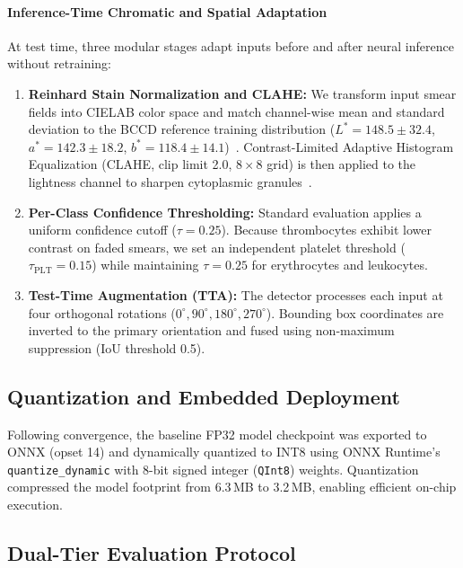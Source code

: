 \documentclass[10pt,conference]{IEEEtran}
\begin{document}
\paragraph{Inference-Time Chromatic and Spatial Adaptation}
At test time, three modular stages adapt inputs before and after neural inference without retraining:
\begin{enumerate}
  \item \textbf{Reinhard Stain Normalization and CLAHE:} We transform input smear fields into CIELAB color space and match channel-wise mean and standard deviation to the BCCD reference training distribution ($L^* = 148.5 \pm 32.4$, $a^* = 142.3 \pm 18.2$, $b^* = 118.4 \pm 14.1$)~\cite{reinhard2001}. Contrast-Limited Adaptive Histogram Equalization (CLAHE, clip limit 2.0, $8 \times 8$ grid) is then applied to the lightness channel to sharpen cytoplasmic granules~\cite{zuiderveld1994}.
  \item \textbf{Per-Class Confidence Thresholding:} Standard evaluation applies a uniform confidence cutoff ($\tau = 0.25$). Because thrombocytes exhibit lower contrast on faded smears, we set an independent platelet threshold ($\tau_{\text{PLT}} = 0.15$) while maintaining $\tau = 0.25$ for erythrocytes and leukocytes.
  \item \textbf{Test-Time Augmentation (TTA):} The detector processes each input at four orthogonal rotations ($0^\circ, 90^\circ, 180^\circ, 270^\circ$). Bounding box coordinates are inverted to the primary orientation and fused using non-maximum suppression (IoU threshold 0.5).
\end{enumerate}

\subsection{Quantization and Embedded Deployment}
\label{sec:quantization}
Following convergence, the baseline FP32 model checkpoint was exported to ONNX (opset 14) and dynamically quantized to INT8 using ONNX Runtime's \texttt{quantize\_dynamic} with 8-bit signed integer (\texttt{QInt8}) weights. Quantization compressed the model footprint from 6.3\,MB to 3.2\,MB, enabling efficient on-chip execution.

\subsection{Dual-Tier Evaluation Protocol}
\end{document}
